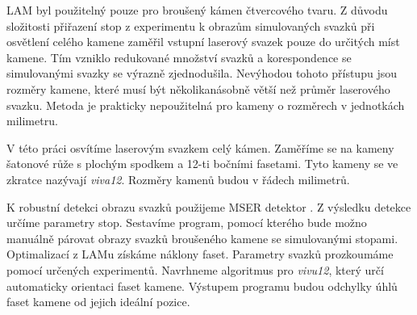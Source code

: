 LAM byl použitelný pouze pro broušený kámen čtvercového tvaru. Z důvodu složitosti přiřazení stop z experimentu k obrazům simulovaných svazků při osvětlení celého kamene zaměřil vstupní laserový svazek pouze do určitých míst kamene. Tím vzniklo redukované množství svazků a korespondence se simulovanými svazky se výrazně zjednodušila. Nevýhodou tohoto přístupu jsou rozměry kamene, které musí být několikanásobně větší než průměr laserového svazku. Metoda je prakticky nepoužitelná pro kameny o rozměrech v jednotkách milimetru. 

	V této práci osvítíme laserovým svazkem celý kámen. Zaměříme se na kameny šatonové růže s plochým spodkem a 12-ti bočními fasetami. Tyto kameny se ve zkratce nazývají \textit{viva12}. Rozměry kamenů budou v řádech milimetrů. 
	
	K robustní detekci obrazu svazků použijeme MSER detektor \cite{Matas}. Z výsledku detekce určíme parametry stop. Sestavíme program, pomocí kterého bude možno manuálně párovat obrazy svazků broušeného kamene se simulovanými stopami.
 Optimalizací z LAMu získáme náklony faset. Parametry svazků prozkoumáme pomocí určených experimentů. Navrhneme algoritmus pro \textit{vivu12}, který určí automaticky orientaci faset kamene. Výstupem programu budou odchylky úhlů faset kamene od jejich ideální pozice.

















